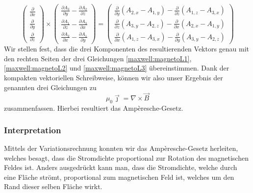 \begin{equation}
	\renewcommand{\arraystretch}{1.9}
	\begin{pmatrix}
		\displaystyle
		\frac{\partial}{\partial x} \\
		\displaystyle
		\frac{\partial}{\partial y} \\
		\displaystyle
		\frac{\partial}{\partial z}
	\end{pmatrix}
	\times
	\begin{pmatrix}
		\displaystyle
		\frac{\partial A_3}{\partial y} -\frac{\partial A_2}{\partial z}\\
		\displaystyle
		\frac{\partial A_1}{\partial z} -\frac{\partial A_3}{\partial x}\\
		\displaystyle
		\frac{\partial A_2}{\partial x} -\frac{\partial A_1}{\partial y}
	\end{pmatrix}
	=
	\begin{pmatrix}
		\displaystyle
		\frac{\partial}{\partial y}(A_{2,x}-A_{1,y}) - \frac{\partial}{\partial z}(A_{1,z}-A_{3,x})	\\
		\displaystyle
		\frac{\partial}{\partial z}(A_{3,y}-A_{2,z}) - \frac{\partial}{\partial x}(A_{2,x}-A_{1,y}) \\
		\displaystyle
		\frac{\partial}{\partial x}(A_{1,z}-A_{3,x}) - \frac{\partial}{\partial y}(A_{3,y}-A_{2,z})
	\end{pmatrix}
\end{equation}
Wir stellen fest, dass die drei Komponenten des resultierenden Vektors genau mit den rechten Seiten der drei Gleichungen \ref{maxwell:magnetoL1}, \ref{maxwell:magnetoL2} und \ref{maxwell:magnetoL3} übereinstimmen.
Dank der kompakten vektoriellen Schreibweise, können wir also unser Ergebnis der genannten drei Gleichungen zu
\[ 
\mu_0\vec{\jmath} 
= 
\nabla \times \vec{B}
 \]
zusammenfassen. Hierbei resultiert das Ampèresche-Gesetz.

\subsubsection{Interpretation}

Mittels der Variationsrechnung konnten wir das Ampèresche-Gesetz herleiten, welches besagt, dass die Stromdichte proportional zur Rotation des magnetischen Feldes ist. Anders ausgedrückt kann man, dass die Stromdichte, welche durch eine Fläche strömt, proportional zum magnetischen Feld ist, welches um den Rand dieser selben Fläche wirkt.


